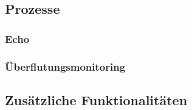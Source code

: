 \subsection{Prozesse}
\subsubsection{Echo}
\subsubsection{Überflutungsmonitoring}
\subsection{Zusätzliche Funktionalitäten}